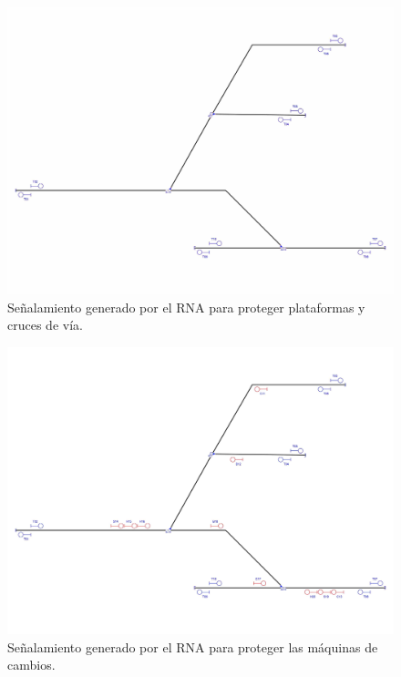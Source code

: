     \begin{figure}[h]
        \centering
        \includegraphics[width=1\textwidth]{resultados-obtenidos/ejemplo7/images/7_step3.png}
        \centering\caption{Señalamiento generado por el RNA para proteger plataformas y cruces de vía.}
    \end{figure}

    \begin{figure}[h]
        \centering
        \includegraphics[width=1\textwidth]{resultados-obtenidos/ejemplo7/images/7_step4.png}
        \centering\caption{Señalamiento generado por el RNA para proteger las máquinas de cambios.}
    \end{figure}

